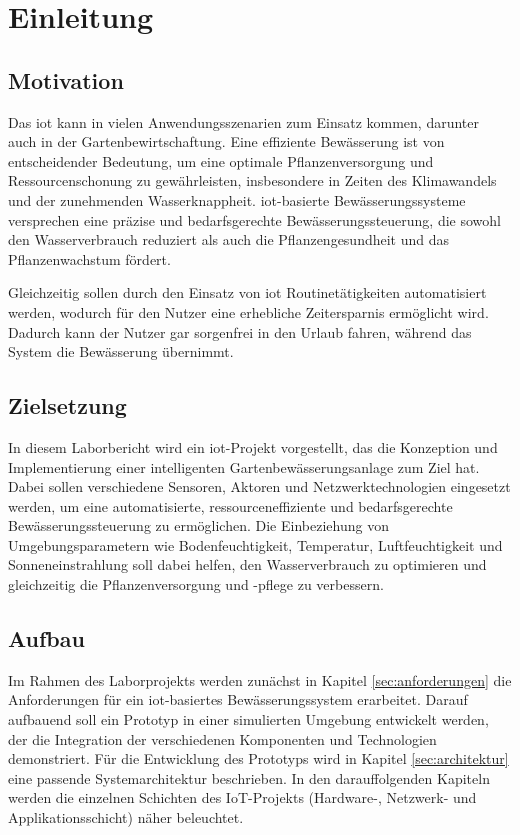 
\section{Einleitung}

\subsection{Motivation}
Das \gls{iot} kann in vielen Anwendungsszenarien zum Einsatz kommen, darunter auch in der Gartenbewirtschaftung. Eine effiziente Bewässerung ist von entscheidender Bedeutung, um eine optimale Pflanzenversorgung und Ressourcenschonung zu gewährleisten, insbesondere in Zeiten des Klimawandels und der zunehmenden Wasserknappheit. \gls{iot}-basierte Bewässerungssysteme versprechen eine präzise und bedarfsgerechte Bewässerungssteuerung, die sowohl den Wasserverbrauch reduziert als auch die Pflanzengesundheit und das Pflanzenwachstum fördert.

Gleichzeitig sollen durch den Einsatz von \gls{iot} Routinetätigkeiten automatisiert werden, wodurch für den Nutzer eine erhebliche Zeitersparnis ermöglicht wird.
Dadurch kann der Nutzer gar sorgenfrei in den Urlaub fahren, während das System die Bewässerung übernimmt.

\subsection{Zielsetzung}

In diesem Laborbericht wird ein \gls{iot}-Projekt vorgestellt, das die Konzeption und Implementierung einer intelligenten Gartenbewässerungsanlage zum Ziel hat. Dabei sollen verschiedene Sensoren, Aktoren und Netzwerktechnologien eingesetzt werden, um eine automatisierte, ressourceneffiziente und bedarfsgerechte Bewässerungssteuerung zu ermöglichen. Die Einbeziehung von Umgebungsparametern wie Bodenfeuchtigkeit, Temperatur, Luftfeuchtigkeit und Sonneneinstrahlung soll dabei helfen, den Wasserverbrauch zu optimieren und gleichzeitig die Pflanzenversorgung und -pflege zu verbessern.

\subsection{Aufbau}

Im Rahmen des Laborprojekts werden zunächst in Kapitel \ref{sec:anforderungen} die Anforderungen für ein \gls{iot}-basiertes Bewässerungssystem erarbeitet. Darauf aufbauend soll ein Prototyp in einer simulierten Umgebung entwickelt werden, der die Integration der verschiedenen Komponenten und Technologien demonstriert. Für die Entwicklung des Prototyps wird in Kapitel \ref{sec:architektur} eine passende Systemarchitektur beschrieben. In den darauffolgenden Kapiteln werden die einzelnen Schichten des IoT-Projekts (Hardware-, Netzwerk- und Applikationsschicht) näher beleuchtet.